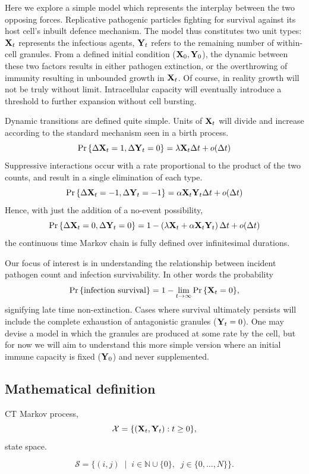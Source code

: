 Here we explore a simple model which represents the interplay between the two opposing forces. Replicative pathogenic particles fighting for survival against its host cell's inbuilt defence mechanism. The model thus constitutes two unit types: ${{\bf X}_t}$ represents the infectious agents, ${{\bf Y}_t}$ refers to the remaining number of within-cell granules. From a defined initial condition (${\bf X}_0, {\bf Y}_0$), the dynamic between these two factors results in either pathogen extinction, or the overthrowing of immunity resulting in unbounded growth in ${{\bf X}_t}$. Of course, in reality growth will not be truly without limit. Intracellular capacity will eventually introduce a threshold to further expansion without cell bursting.\par
Dynamic transitions are defined quite simple. Units of ${{\bf X}_t}$ will divide and increase according to the standard mechanism seen in a birth process. 
$${\text{Pr}\left\{\Delta {{\bf X}_t} = 1, \Delta {{\bf Y}_t} = 0\right\}} = \lambda {{\bf X}_t} \Delta t + o(\Delta t) $$
Suppressive interactions occur with a rate proportional to the product of the two counts, and result in a single elimination of each type.  
 $${\text{Pr}\left\{\Delta {{\bf X}_t} = -1, \Delta {{\bf Y}_t} = -1\right\}} = \alpha {{\bf X}_t} {{\bf Y}_t}  \Delta t + o(\Delta t) $$
 Hence, with just the addition of a no-event possibility, 
 $${\text{Pr}\left\{\Delta {{\bf X}_t} = 0, \Delta {{\bf Y}_t} = 0\right\}} = 1 -  \left( \lambda{{\bf X}_t}   + \alpha {{\bf X}_t} {{\bf Y}_t} \right) \Delta t + o(\Delta t) $$
 the continuous time Markov chain is fully defined over infinitesimal durations.


Our focus of interest is in understanding the relationship between incident pathogen count and infection survivability. In other words the probability 
$${\text{Pr}\left\{\text{infection survival}\right\}} =  1 - \lim_{t\to\infty} {\text{Pr}\left\{{{\bf X}_t} = 0\right\}},$$
signifying late time non-extinction. Cases where survival ultimately persists will include the complete exhaustion of antagonistic granules (${{\bf Y}_t} = 0$). One may devise a model in which the granules are produced at some rate by the cell, but for now we will aim to understand this more simple version where an initial immune capacity is fixed (${\bf Y}_0$) and never supplemented.  



\subsection{Mathematical definition}


CT Markov process,
$$\mathcal{X} = \{ ({{\bf X}_t}, {{\bf Y}_t}): t\geq 0\},$$
 state space.

$$\mathcal{S} = \{    (i,j)\;\; |\;\; i \in \mathbb{N} \cup \{0\}  ,\;\;j\in\{0,\dots,N\}\} .$$



